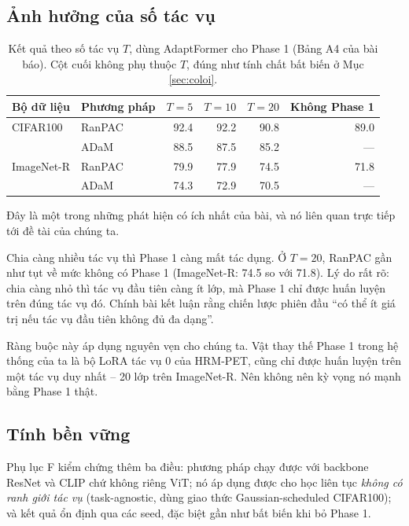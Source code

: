 \documentclass[11pt,a4paper]{article}
\newenvironment{luuy}{\begin{leftbar}\noindent\ignorespaces}{\end{leftbar}}
\begin{document}
\subsection{Ảnh hưởng của số tác vụ}
\label{sec:sotacvu}

\begin{table}[htbp]
\centering
\caption{Kết quả theo số tác vụ $T$, dùng AdaptFormer cho Phase 1 (Bảng A4 của
bài báo). Cột cuối không phụ thuộc $T$, đúng như tính chất bất biến ở Mục
\ref{sec:coloi}.}
\label{tab:sotacvu}
\begin{tabular}{llrrrr}
\toprule
Bộ dữ liệu & Phương pháp & $T = 5$ & $T = 10$ & $T = 20$ & Không Phase 1 \\
\midrule
CIFAR100   & RanPAC & 92.4 & 92.2 & 90.8 & 89.0 \\
           & ADaM   & 88.5 & 87.5 & 85.2 & --- \\
\addlinespace
ImageNet-R & RanPAC & 79.9 & 77.9 & 74.5 & 71.8 \\
           & ADaM   & 74.3 & 72.9 & 70.5 & --- \\
\bottomrule
\end{tabular}
\end{table}

Đây là một trong những phát hiện có ích nhất của bài, và nó liên quan trực tiếp
tới đề tài của chúng ta.

Chia càng nhiều tác vụ thì Phase 1 càng mất tác dụng. Ở $T = 20$, RanPAC gần như
tụt về mức không có Phase 1 (ImageNet-R: 74.5 so với 71.8). Lý do rất rõ: chia
càng nhỏ thì tác vụ đầu tiên càng ít lớp, mà Phase 1 chỉ được huấn luyện trên
đúng tác vụ đó. Chính bài kết luận rằng chiến lược phiên đầu ``có thể ít giá trị
nếu tác vụ đầu tiên không đủ đa dạng''.

\begin{luuy}
Ràng buộc này áp dụng nguyên vẹn cho chúng ta. Vật thay thế Phase 1 trong hệ
thống của ta là bộ LoRA tác vụ 0 của HRM-PET, cũng chỉ được huấn luyện trên một
tác vụ duy nhất -- 20 lớp trên ImageNet-R. Nên không nên kỳ vọng nó mạnh bằng
Phase 1 thật.
\end{luuy}

\subsection{Tính bền vững}

Phụ lục F kiểm chứng thêm ba điều: phương pháp chạy được với backbone ResNet và
CLIP chứ không riêng ViT; nó áp dụng được cho học liên tục \emph{không có ranh
giới tác vụ} (task-agnostic, dùng giao thức Gaussian-scheduled CIFAR100); và kết
quả ổn định qua các seed, đặc biệt gần như bất biến khi bỏ Phase 1.
\end{document}
